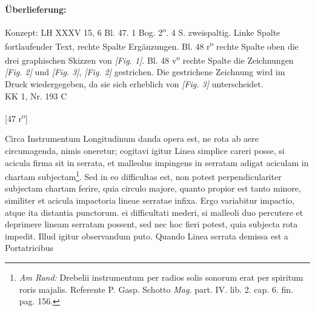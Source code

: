    
        
        \begin{ledgroupsized}[r]{120mm}
        \footnotesize 
        \pstart        
        \noindent\textbf{\"{U}berlieferung:}  
        \pend
        \end{ledgroupsized}
      
       
              \begin{ledgroupsized}[r]{114mm}
              \footnotesize 
              \pstart \parindent -6mm
              Konzept: LH XXXV 15, 6 Bl. 47. 1 Bog. 2\textsuperscript{o}. 4 S. zweispaltig. Linke Spalte fortlaufender Text, rechte Spalte Erg\"{a}nzungen. Bl. 48 r\textsuperscript{o} rechte Spalte oben die drei graphischen Skizzen von \textit{[Fig. 1]}. Bl. 48 v\textsuperscript{o} rechte Spalte die Zeichnungen \textit{[Fig. 2]} und \textit{[Fig. 3]}, \textit{[Fig. 2]} gestrichen. Die gestrichene Zeichnung wird im Druck wiedergegeben, da sie sich erheblich von \textit{[Fig. 3]} unterscheidet.\\KK 1, Nr. 193 C \pend
              \end{ledgroupsized}
        \vspace*{8mm}
        \pstart 
        \normalsize
    \begin{center}[47 r\textsuperscript{o}] \end{center}\pend \vspace{1.0ex} \pstart Circa Instrumentum Longitudinum\protect{} danda opera est, ne rota\protect{} ab aere circumagenda, nimis oneretur; cogitavi igitur Linea simplice careri posse, si acicula firma sit in serrata, et malleolus impingens in serratam adigat aciculam in chartam subjectam\footnote{\textit{Am Rand:} Drebelii\protect{} instrumentum per radios solis sonorum erat per spiritum roris majalis. Referente P. Gasp. Schotto \protect{}\cite{00094}\textit{Mag.} part. IV. lib. 2. cap. 6. fin. pag. 156.}. Sed in eo difficultas est,  non potest perpendiculariter subjectam chartam ferire, quia  circulo majore, quanto propior est tanto minore, similiter et acicula impactoria lineae serratae infixa. Ergo variabitur impactio, atque ita distantia punctorum.  ei difficultati mederi, si malleoli duo percutere et deprimere lineam serratam possent, sed nec hoc fieri potest, quia subjecta rota\protect{} impedit. Illud igitur observandum puto. Quando Linea serrata demissa est a Portatricibus
